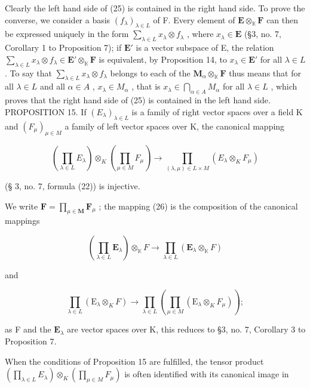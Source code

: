 Clearly the left hand side of (25) is contained in the right hand side. To prove the converse, we consider a basis \((f_{\lambda})_{\lambda \in L}\) of F. Every element of \(\mathbf{E} \otimes_{\mathbb{K}} \mathbf{F}\) can then be expressed uniquely in the form \(\sum_{\lambda \in L} x_{\lambda} \otimes f_{\lambda}\) , where \(x_{\lambda} \in \mathbf{E}\) (§3, no. 7, Corollary 1 to Proposition 7); if \(\mathbf{E}'\) is a vector subspace of E, the relation \(\sum_{\lambda \in L} x_{\lambda} \otimes f_{\lambda} \in \mathbf{E}' \otimes_{\mathbb{K}} \mathbf{F}\) is equivalent, by Proposition 14, to \(x_{\lambda} \in \mathbf{E}'\) for all \(\lambda \in L\) . To say that \(\sum_{\lambda \in L} x_{\lambda} \otimes f_{\lambda}\) belongs to each of the \(\mathbf{M}_{\alpha} \otimes_{\mathbb{K}} \mathbf{F}\) thus means that for all \(\lambda \in L\) and all \(\alpha \in A\) , \(x_{\lambda} \in M_{\alpha}\) , that is \(x_{\lambda} \in \bigcap_{\alpha \in A} M_{\alpha}\) for all \(\lambda \in L\) , which proves that the right hand side of (25) is contained in the left hand side. PROPOSITION 15. If \((E_{\lambda})_{\lambda \in L}\) is a family of right vector spaces over a field K and \((F_{\mu})_{\mu \in M}\) a family of left vector spaces over K, the canonical mapping

\[
\left(\prod_ {\lambda \in L} E _ {\lambda}\right) \otimes_ {K} \left(\prod_ {\mu \in M} F _ {\mu}\right)\rightarrow \prod_ {(\lambda , \mu) \in L \times M} (E _ {\lambda} \otimes_ {K} F _ {\mu})\tag{26}
\]

(§ 3, no. 7, formula (22)) is injective.

We write \(\mathbf{F} = \prod_{\mu \in \mathbf{M}} \mathbf{F}_{\mu}\) ; the mapping (26) is the composition of the canonical mappings

\[
\left(\prod_ {\lambda \in L} \mathbf {E} _ {\lambda}\right) \otimes_ {\mathbb {K}} F \rightarrow \prod_ {\lambda \in L} \left(\mathbf {E} _ {\lambda} \otimes_ {\mathbb {K}} F\right)
\]

and

\[
\prod_ {\lambda \in L} \left(\mathrm{E} _ {\lambda} \otimes_ {K} F\right)\rightarrow \prod_ {\lambda \in L} \left(\prod_ {\mu \in M} \left(\mathrm{E} _ {\lambda} \otimes_ {K} F _ {\mu}\right)\right);
\]

as F and the \(\mathbf{E}_{\lambda}\) are vector spaces over K, this reduces to §3, no. 7, Corollary 3 to Proposition 7.

When the conditions of Proposition 15 are fulfilled, the tensor product \(\left(\prod_{\lambda \in L} E_{\lambda}\right) \otimes_{K} \left(\prod_{\mu \in M} F_{\mu}\right)\) is often identified with its canonical image in

